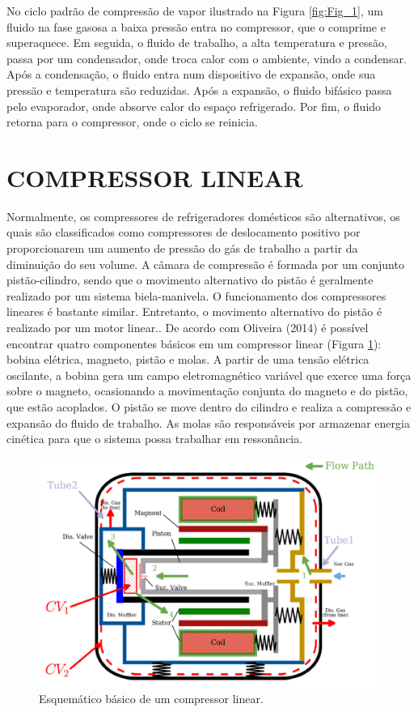  No ciclo padrão de compressão de vapor ilustrado na Figura \ref{fig:Fig_1}, um fluido na fase gasosa a baixa pressão entra no compressor, que o comprime e superaquece. Em seguida, o fluido de trabalho, a alta temperatura e pressão, passa por um condensador, onde troca calor com o ambiente, vindo a condensar. Após a condensação, o fluido entra num dispositivo de expansão, onde sua pressão e temperatura são reduzidas. Após a expansão, o fluido bifásico passa pelo evaporador, onde absorve calor do espaço refrigerado. Por fim, o fluido retorna para o compressor, onde o ciclo se reinicia.

\section{COMPRESSOR LINEAR}

Normalmente, os compressores de refrigeradores domésticos são alternativos, os quais são classificados como compressores de deslocamento positivo por proporcionarem um aumento de pressão do gás de trabalho a partir da diminuição do seu volume. A câmara de compressão é formada por um conjunto pistão-cilindro, sendo que o movimento alternativo do pistão é geralmente realizado por um sistema biela-manivela. O funcionamento dos compressores lineares é bastante similar. Entretanto, o movimento alternativo do pistão é realizado por um motor linear..
De acordo com Oliveira (2014) é possível encontrar quatro componentes básicos em um compressor linear (Figura \ref{fig:Fig_2}): bobina elétrica, magneto, pistão e molas. A partir de uma tensão elétrica oscilante, a bobina gera um campo eletromagnético variável que exerce uma força sobre o magneto, ocasionando a movimentação conjunta do magneto e do pistão, que estão acoplados. O pistão se move dentro do cilindro e realiza a compressão e expansão do fluido de trabalho. As molas são responsáveis por armazenar energia cinética para que o sistema possa trabalhar em ressonância.


\begin{figure}[htb]
	\caption{\label{fig:Fig_2}Esquemático básico de um compressor linear.}
	\begin{center}
		\includegraphics[scale=0.50]{images/compressor.png}
	\end{center}
\end{figure}

